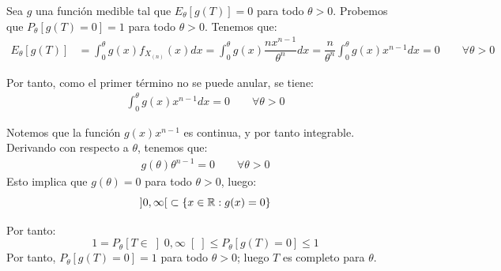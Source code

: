 \begin{ejemplo}
    Sea $g$ una función medible tal que $E_\theta[g(T)] = 0$ para todo $\theta > 0$. Probemos que $P_\theta[g(T)=0] = 1$ para todo $\theta > 0$. Tenemos que:
    \begin{align*}
        E_\theta[g(T)] &= \int_0^\theta g(x) f_{X_{(n)}}(x) dx = \int_0^\theta g(x) \dfrac{n x^{n-1}}{\theta^n} dx = \dfrac{n}{\theta^n} \int_0^\theta g(x) x^{n-1} dx = 0\qquad \forall \theta > 0
    \end{align*}

    Por tanto, como el primer término no se puede anular, se tiene:
    \begin{align*}
        \int_0^\theta g(x) x^{n-1} dx = 0\qquad \forall \theta > 0
    \end{align*}

    Notemos que la función $g(x) x^{n-1}$ es continua, y por tanto integrable. Derivando con respecto a $\theta$, tenemos que:
    \begin{align*}
        g(\theta) \theta^{n-1} = 0\qquad \forall \theta > 0
    \end{align*}
    Esto implica que $g(\theta) = 0$ para todo $\theta > 0$, luego:
    \begin{equation*}
        \left]0, \infty\right[ \subset \{x\in\mathbb{R} : g(x) = 0\}
    \end{equation*}


    Por tanto:
    \begin{equation*}
        1 = P_\theta[T\in \left]0, \infty\right[ ] \leq P_\theta[g(T)=0]\leq 1
    \end{equation*}
    Por tanto, $P_\theta[g(T)=0] = 1$ para todo $\theta > 0$; luego $T$ es completo para $\theta$.
\end{ejemplo}

